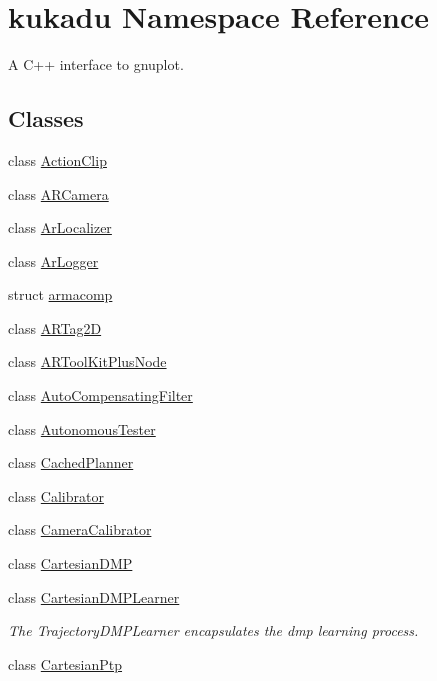 \hypertarget{namespacekukadu}{}\section{kukadu Namespace Reference}
\label{namespacekukadu}


A C++ interface to gnuplot.  


\subsection*{Classes}
\begin{DoxyCompactItemize}
\item 
class \hyperlink{classkukadu_1_1ActionClip}{Action\+Clip}
\item 
class \hyperlink{classkukadu_1_1ARCamera}{A\+R\+Camera}
\item 
class \hyperlink{classkukadu_1_1ArLocalizer}{Ar\+Localizer}
\item 
class \hyperlink{classkukadu_1_1ArLogger}{Ar\+Logger}
\item 
struct \hyperlink{structkukadu_1_1armacomp}{armacomp}
\item 
class \hyperlink{classkukadu_1_1ARTag2D}{A\+R\+Tag2D}
\item 
class \hyperlink{classkukadu_1_1ARToolKitPlusNode}{A\+R\+Tool\+Kit\+Plus\+Node}
\item 
class \hyperlink{classkukadu_1_1AutoCompensatingFilter}{Auto\+Compensating\+Filter}
\item 
class \hyperlink{classkukadu_1_1AutonomousTester}{Autonomous\+Tester}
\item 
class \hyperlink{classkukadu_1_1CachedPlanner}{Cached\+Planner}
\item 
class \hyperlink{classkukadu_1_1Calibrator}{Calibrator}
\item 
class \hyperlink{classkukadu_1_1CameraCalibrator}{Camera\+Calibrator}
\item 
class \hyperlink{classkukadu_1_1CartesianDMP}{Cartesian\+D\+MP}
\item 
class \hyperlink{classkukadu_1_1CartesianDMPLearner}{Cartesian\+D\+M\+P\+Learner}
\begin{DoxyCompactList}\small\item\em The Trajectory\+D\+M\+P\+Learner encapsulates the dmp learning process. \end{DoxyCompactList}\item 
class \hyperlink{classkukadu_1_1CartesianPtp}{Cartesian\+Ptp}
\item 

\end{DoxyCompactItemize}
